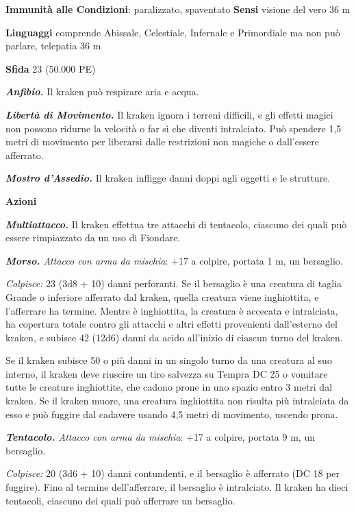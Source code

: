 \begin{multicols}{2}
\textbf{Immunità alle Condizioni}: paralizzato, spaventato \textbf{Sensi}
visione del vero 36 m

\textbf{Linguaggi} comprende Abissale, Celestiale, Infernale e Primordiale ma non può
parlare, telepatia 36 m 

\textbf{Sfida} 23 (50.000 PE)\smallskip

\emph{\textbf{Anfibio.}} Il kraken può respirare aria e acqua.

\emph{\textbf{Libertà di Movimento.}} Il kraken ignora i terreni
difficili, e gli effetti magici non possono ridurne la velocità o far sì
che diventi intralciato. Può spendere 1,5 metri di movimento per
liberarsi dalle restrizioni non magiche o dall'essere afferrato.

\emph{\textbf{Mostro d'Assedio.}} Il kraken infligge danni doppi agli
oggetti e le strutture.

\smallskip\textbf{Azioni}

\emph{\textbf{Multiattacco.}} Il kraken effettua tre attacchi di
tentacolo, ciascuno dei quali può essere rimpiazzato da un uso di
Fiondare.

\emph{\textbf{Morso.} Attacco con arma da mischia}: +17 a colpire,
portata 1 m, un bersaglio.

\emph{Colpisce:} 23 (3d8 + 10) danni perforanti. Se il bersaglio è una
creatura di taglia Grande o inferiore afferrato dal kraken, quella
creatura viene inghiottita, e l'afferrare ha termine. Mentre è
inghiottita, la creatura è accecata e intralciata, ha copertura totale
contro gli attacchi e altri effetti provenienti dall'esterno del kraken,
e subisce 42 (12d6) danni da acido all'inizio di ciascun turno del
kraken.

Se il kraken subisce 50 o più danni in un singolo turno da una creatura
al suo interno, il kraken deve riuscire un tiro salvezza su Tempra
DC 25 o vomitare tutte le creature inghiottite, che cadono prone in uno
spazio entro 3 metri dal kraken. Se il kraken muore, una creatura
inghiottita non risulta più intralciata da esso e può fuggire dal
cadavere usando 4,5 metri di movimento, uscendo prona.

\emph{\textbf{Tentacolo.} Attacco con arma da mischia}: +17 a colpire,
portata 9 m, un bersaglio.

\emph{Colpisce:} 20 (3d6 + 10) danni contundenti, e il bersaglio è
afferrato (DC 18 per fuggire). Fino al termine dell'afferrare, il
bersaglio è intralciato. Il kraken ha dieci tentacoli, ciascuno dei
quali può afferrare un bersaglio.


\end{multicols}

